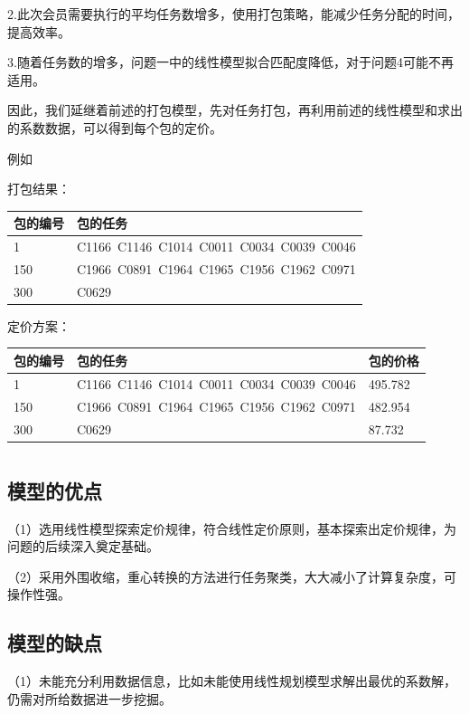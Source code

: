\documentclass{ctexart}
\begin{document}
2.此次会员需要执行的平均任务数增多，使用打包策略，能减少任务分配的时间，提高效率。

3.随着任务数的增多，问题一中的线性模型拟合匹配度降低，对于问题4可能不再适用。


因此，我们延继着前述的打包模型，先对任务打包，再利用前述的线性模型和求出的系数数据，可以得到每个包的定价。



例如

打包结果：

\begin{table}[!h]\centering\small
\begin{tabular}{|l|l|}
\hline
包的编号&	包的任务\\
\hline
1&	C1166\  C1146\  C1014\  C0011\  C0034\  C0039\  C0046	\\
\hline
150	&C1966\  C0891\  C1964\  C1965\  C1956\  C1962\  C0971	\\
\hline
300	&C0629	\\
\hline
\end{tabular}
\end{table}

定价方案：

\begin{table}[!h]\centering\small
\begin{tabular}{|l|l|l|}
\hline
包的编号&	包的任务&	包的价格\\
\hline
1&	C1166\  C1146\  C1014\  C0011\  C0034\  C0039\  C0046	&495.782\\
\hline
150	&C1966\  C0891\  C1964\  C1965\  C1956\  C1962\  C0971	&482.954\\
\hline
300	&C0629	&87.732\\
\hline
\end{tabular}
\end{table}


\section{}
\subsection{ 模型的优点}
（1）选用线性模型探索定价规律，符合线性定价原则，基本探索出定价规律，为问题的后续深入奠定基础。

（2）采用外围收缩，重心转换的方法进行任务聚类，大大减小了计算复杂度，可操作性强。

\subsection{ 模型的缺点}
（1）未能充分利用数据信息，比如未能使用线性规划模型求解出最优的系数解，仍需对所给数据进一步挖掘。
\end{document}
